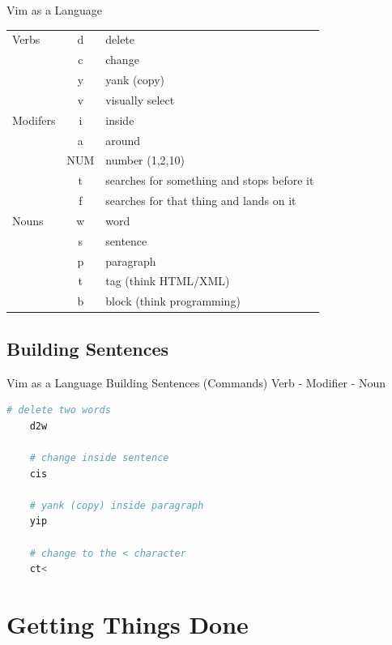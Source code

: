 \documentclass{beamer}
\begin{document}
\begin{frame} {Vim as a Language}
\begin{table}
    \centering
    \label{tab:label}
    \begin{tabular}{l|c|l}
        Verbs    & d   & delete \\
                 & c   & change           \\
                 & y   & yank (copy)      \\
                 & v   & visually select  \\
        \hline
        Modifers & i   & inside \\
                 & a   & around \\
                 & NUM & number (1,2,10) \\
                 & t   & searches for something and stops before it \\
                 & f   & searches for that thing and lands on it \\
        \hline
        Nouns    & w   & word \\
                 & s   & sentence \\
                 & p   & paragraph \\
                 & t   & tag (think HTML/XML) \\
                 & b   & block (think programming) \\
    \end{tabular}
\end{table}
\end{frame}


\subsection{Building Sentences}
\begin{frame}[fragile] {Vim as a Language} {Building Sentences (Commands)}
    \centering
    Verb - Modifier - Noun

    \begin{lstlisting}[language=sh]
    # delete two words
    d2w

    # change inside sentence
    cis

    # yank (copy) inside paragraph 
    yip

    # change to the < character
    ct<
    \end{lstlisting}
\end{frame}


\section{Getting Things Done}
\end{document}
